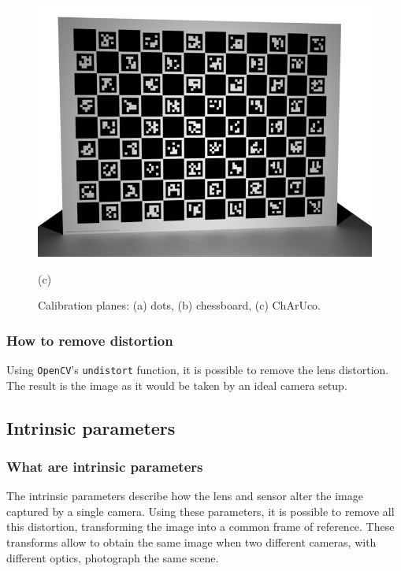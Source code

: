 \begin{figure}
	\includegraphics[width=\linewidth]{images/calib-charuco.png}
	\caption*{(c)}
	\endminipage

	\captionsetup{list=true}
	
	\caption{Calibration planes: (a) dots, (b) chessboard, (c) ChArUco.}\label{fig:calibration-planes}
\end{figure}

\subsubsection{How to remove distortion}
Using \texttt{OpenCV}'s \texttt{undistort} function, it is possible to remove the lens distortion.
The result is the image as it would be taken by an ideal camera setup.

\subsection[Intrinsic parameters]{Intrinsic parameters~\cite{calib-intrinsics}}

\subsubsection{What are intrinsic parameters}

The intrinsic parameters describe how the lens and sensor alter the image captured by a single camera.
Using these parameters, it is possible to remove all this distortion, transforming the image into a common frame of reference.
These transforms allow to obtain the same image when two different cameras, with different optics, photograph the same scene.

